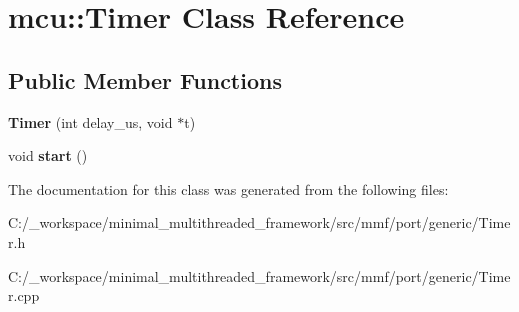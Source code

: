 \hypertarget{classmcu_1_1_timer}{\section{mcu\-:\-:Timer Class Reference}
\label{classmcu_1_1_timer}
}
\subsection*{Public Member Functions}
\begin{DoxyCompactItemize}
\item 
\hypertarget{classmcu_1_1_timer_af5351ebc49fcdb89593cd8a196f4de3b}{{\bfseries Timer} (int delay\-\_\-us, void $\ast$t)}\label{classmcu_1_1_timer_af5351ebc49fcdb89593cd8a196f4de3b}

\item 
\hypertarget{classmcu_1_1_timer_adb8185e255e932ba3396c3c34c5cb1d3}{void {\bfseries start} ()}\label{classmcu_1_1_timer_adb8185e255e932ba3396c3c34c5cb1d3}

\end{DoxyCompactItemize}


The documentation for this class was generated from the following files\-:\begin{DoxyCompactItemize}
\item 
C\-:/\-\_\-workspace/minimal\-\_\-multithreaded\-\_\-framework/src/mmf/port/generic/Timer.\-h\item 
C\-:/\-\_\-workspace/minimal\-\_\-multithreaded\-\_\-framework/src/mmf/port/generic/Timer.\-cpp\end{DoxyCompactItemize}
